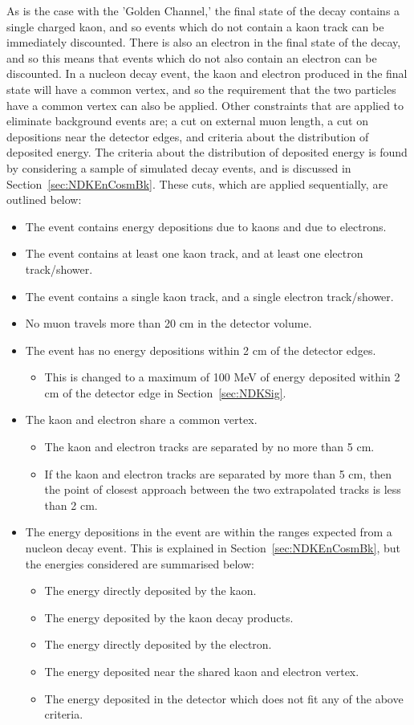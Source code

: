 As is the case with the 'Golden Channel,' the final state of the decay contains a single charged kaon, and so events which do not contain a kaon track can be immediately discounted. There is also an electron in the final state of the decay, and so this means that events which do not also contain an electron can be discounted. In a nucleon decay event, the kaon and electron produced in the final state will have a common vertex, and so the requirement that the two particles have a common vertex can also be applied. Other constraints that are applied to eliminate background events are; a cut on external muon length, a cut on depositions near the detector edges, and criteria about the distribution of deposited energy. The criteria about the distribution of deposited energy is found by considering a sample of simulated decay events, and is discussed in Section~\ref{sec:NDKEnCosmBk}. These cuts, which are applied sequentially, are outlined below:
\begin{itemize}
\item The event contains energy depositions due to kaons and due to electrons.
\item The event contains at least one kaon track, and at least one electron track/shower.
\item The event contains a single kaon track, and a single electron track/shower.
\item No muon travels more than 20 cm in the detector volume.
\item The event has no energy depositions within 2 cm of the detector edges.
  \begin{itemize}
  \item This is changed to a maximum of 100 MeV of energy deposited within 2 cm of the detector edge in Section~\ref{sec:NDKSig}.
  \end{itemize}
\item The kaon and electron share a common vertex.
  \begin{itemize}
  \item The kaon and electron tracks are separated by no more than 5 cm.
  \item If the kaon and electron tracks are separated by more than 5 cm, then the point of closest approach between the two extrapolated tracks is less than 2 cm.
  \end{itemize}
\item The energy depositions in the event are within the ranges expected from a nucleon decay event. This is explained in Section~\ref{sec:NDKEnCosmBk}, but the energies considered are summarised below:
  \begin{itemize}
  \item The energy directly deposited by the kaon.
  \item The energy deposited by the kaon decay products.
  \item The energy directly deposited by the electron.
  \item The energy deposited near the shared kaon and electron vertex.
  \item The energy deposited in the detector which does not fit any of the above criteria.
  \end{itemize}
\end{itemize}
